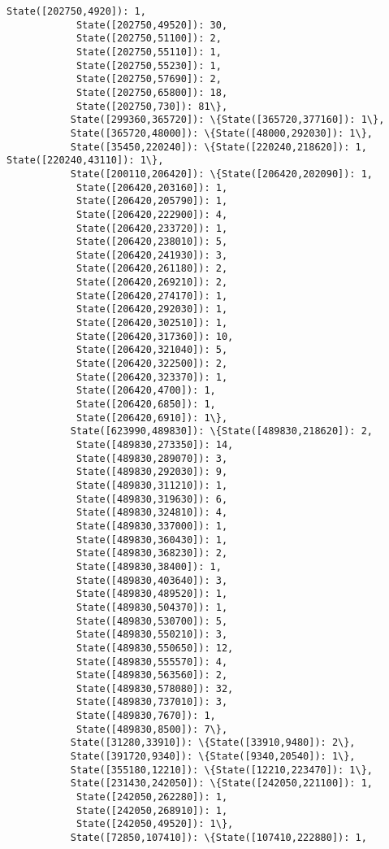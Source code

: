 \documentclass[11pt]{article}
\begin{document}
\begin{Verbatim}[commandchars=\\\{\}]
            State([202750,4920]): 1,
            State([202750,49520]): 30,
            State([202750,51100]): 2,
            State([202750,55110]): 1,
            State([202750,55230]): 1,
            State([202750,57690]): 2,
            State([202750,65800]): 18,
            State([202750,730]): 81\},
           State([299360,365720]): \{State([365720,377160]): 1\},
           State([365720,48000]): \{State([48000,292030]): 1\},
           State([35450,220240]): \{State([220240,218620]): 1, State([220240,43110]): 1\},
           State([200110,206420]): \{State([206420,202090]): 1,
            State([206420,203160]): 1,
            State([206420,205790]): 1,
            State([206420,222900]): 4,
            State([206420,233720]): 1,
            State([206420,238010]): 5,
            State([206420,241930]): 3,
            State([206420,261180]): 2,
            State([206420,269210]): 2,
            State([206420,274170]): 1,
            State([206420,292030]): 1,
            State([206420,302510]): 1,
            State([206420,317360]): 10,
            State([206420,321040]): 5,
            State([206420,322500]): 2,
            State([206420,323370]): 1,
            State([206420,4700]): 1,
            State([206420,6850]): 1,
            State([206420,6910]): 1\},
           State([623990,489830]): \{State([489830,218620]): 2,
            State([489830,273350]): 14,
            State([489830,289070]): 3,
            State([489830,292030]): 9,
            State([489830,311210]): 1,
            State([489830,319630]): 6,
            State([489830,324810]): 4,
            State([489830,337000]): 1,
            State([489830,360430]): 1,
            State([489830,368230]): 2,
            State([489830,38400]): 1,
            State([489830,403640]): 3,
            State([489830,489520]): 1,
            State([489830,504370]): 1,
            State([489830,530700]): 5,
            State([489830,550210]): 3,
            State([489830,550650]): 12,
            State([489830,555570]): 4,
            State([489830,563560]): 2,
            State([489830,578080]): 32,
            State([489830,737010]): 3,
            State([489830,7670]): 1,
            State([489830,8500]): 7\},
           State([31280,33910]): \{State([33910,9480]): 2\},
           State([391720,9340]): \{State([9340,20540]): 1\},
           State([355180,12210]): \{State([12210,223470]): 1\},
           State([231430,242050]): \{State([242050,221100]): 1,
            State([242050,262280]): 1,
            State([242050,268910]): 1,
            State([242050,49520]): 1\},
           State([72850,107410]): \{State([107410,222880]): 1,

\end{Verbatim}
\end{document}
